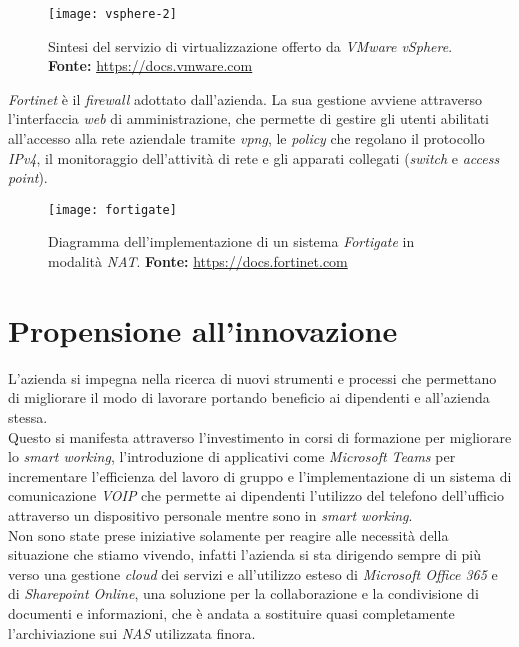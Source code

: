 \vspace{20pt}

\begin{figure}[htbp]
	\begin{center}
		\texttt{[image: vsphere-2]}
		\caption{Sintesi del servizio di virtualizzazione offerto da \textit{VMware vSphere}. \newline \textbf{Fonte: } \url{https://docs.vmware.com}}
	\end{center}
\end{figure}

\vspace{15pt}

\textit{Fortinet} è il \textit{firewall} adottato dall'azienda. La sua gestione avviene attraverso l'interfaccia \textit{web} di amministrazione, che permette di gestire gli utenti abilitati all'accesso alla rete aziendale tramite \textit{\gls{vpng}\glsfirstoccur}, le \textit{policy} che regolano il protocollo \textit{IPv4}, il monitoraggio dell'attività di rete e gli apparati collegati (\textit{switch} e \textit{access point}).

\vspace{10pt}
\begin{figure}[htbp]
	\begin{center}
		\texttt{[image: fortigate]}
		\caption{Diagramma dell'implementazione di un sistema \textit{Fortigate} in modalità \textit{NAT}. \newline \textbf{Fonte: } \url{https://docs.fortinet.com}}
	\end{center}
\end{figure}
\vspace{10pt}


\section{Propensione all'innovazione}

L'azienda si impegna nella ricerca di nuovi strumenti e processi che permettano di migliorare il modo di lavorare portando beneficio ai dipendenti e all'azienda stessa.\\
Questo si manifesta attraverso l'investimento in corsi di formazione per migliorare lo \textit{smart working}, l'introduzione di applicativi come \textit{Microsoft Teams} per incrementare l'efficienza del lavoro di gruppo e l'implementazione di un sistema di comunicazione \textit{VOIP} che permette ai dipendenti l'utilizzo del telefono dell'ufficio attraverso un dispositivo personale mentre sono in \textit{smart working}. \\
Non sono state prese iniziative solamente per reagire alle necessità della situazione che stiamo vivendo, infatti l'azienda si sta dirigendo sempre di più verso una gestione \textit{cloud} dei servizi e all'utilizzo esteso di \textit{Microsoft Office 365} e di \textit{Sharepoint Online}, una soluzione per la collaborazione e la condivisione di documenti e informazioni, che è andata a sostituire quasi completamente l'archiviazione sui \textit{NAS} utilizzata finora.


